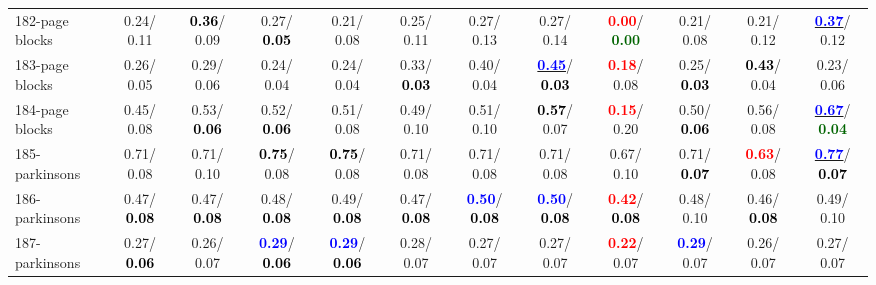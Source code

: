 \begin{table}[h]
\begin{center}
{\begin{tabular}{lc|c|c|c|c|c|c|c|c|c|c}
182-page blocks &   0.24/  0.11 & \textcolor{black}{\textbf{  0.36}}/  0.09 &   0.27/\textcolor{black}{\textbf{  0.05}} &   0.21/  0.08 &   0.25/  0.11 &   0.27/  0.13 &   0.27/  0.14 & \textcolor{red}{\textbf{  0.00}}/\textcolor{darkgreen}{\textbf{  0.00}} &   0.21/  0.08 &   0.21/  0.12 & \underline{\textcolor{blue}{\textbf{  0.37}}}/  0.12 \\
183-page blocks &   0.26/  0.05 &   0.29/  0.06 &   0.24/  0.04 &   0.24/  0.04 &   0.33/\textcolor{black}{\textbf{  0.03}} &   0.40/  0.04 & \underline{\textcolor{blue}{\textbf{  0.45}}}/\textcolor{black}{\textbf{  0.03}} & \textcolor{red}{\textbf{  0.18}}/  0.08 &   0.25/\textcolor{black}{\textbf{  0.03}} & \textcolor{black}{\textbf{  0.43}}/  0.04 &   0.23/  0.06 \\
184-page blocks &   0.45/  0.08 &   0.53/\textcolor{black}{\textbf{  0.06}} &   0.52/\textcolor{black}{\textbf{  0.06}} &   0.51/  0.08 &   0.49/  0.10 &   0.51/  0.10 & \textcolor{black}{\textbf{  0.57}}/  0.07 & \textcolor{red}{\textbf{  0.15}}/  0.20 &   0.50/\textcolor{black}{\textbf{  0.06}} &   0.56/  0.08 & \underline{\textcolor{blue}{\textbf{  0.67}}}/\textcolor{darkgreen}{\textbf{  0.04}} \\
185-parkinsons &   0.71/  0.08 &   0.71/  0.10 & \textcolor{black}{\textbf{  0.75}}/  0.08 & \textcolor{black}{\textbf{  0.75}}/  0.08 &   0.71/  0.08 &   0.71/  0.08 &   0.71/  0.08 &   0.67/  0.10 &   0.71/\textcolor{black}{\textbf{  0.07}} & \textcolor{red}{\textbf{  0.63}}/  0.08 & \underline{\textcolor{blue}{\textbf{  0.77}}}/\textcolor{black}{\textbf{  0.07}} \\
186-parkinsons &   0.47/\textcolor{black}{\textbf{  0.08}} &   0.47/\textcolor{black}{\textbf{  0.08}} &   0.48/\textcolor{black}{\textbf{  0.08}} &   0.49/\textcolor{black}{\textbf{  0.08}} &   0.47/\textcolor{black}{\textbf{  0.08}} & \textcolor{blue}{\textbf{  0.50}}/\textcolor{black}{\textbf{  0.08}} & \textcolor{blue}{\textbf{  0.50}}/\textcolor{black}{\textbf{  0.08}} & \textcolor{red}{\textbf{  0.42}}/\textcolor{black}{\textbf{  0.08}} &   0.48/  0.10 &   0.46/\textcolor{black}{\textbf{  0.08}} &   0.49/  0.10 \\
187-parkinsons &   0.27/\textcolor{black}{\textbf{  0.06}} &   0.26/  0.07 & \textcolor{blue}{\textbf{  0.29}}/\textcolor{black}{\textbf{  0.06}} & \textcolor{blue}{\textbf{  0.29}}/\textcolor{black}{\textbf{  0.06}} &   0.28/  0.07 &   0.27/  0.07 &   0.27/  0.07 & \textcolor{red}{\textbf{  0.22}}/  0.07 & \textcolor{blue}{\textbf{  0.29}}/  0.07 &   0.26/  0.07 &   0.27/  0.07 \\

\end{tabular}}
\end{center}
\end{table}
